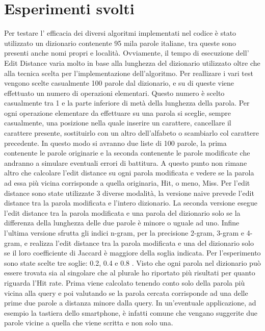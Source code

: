 \documentclass{article}
\begin{document}
\section{Esperimenti svolti}
Per testare l' efficacia dei diversi algoritmi implementati nel codice è stato utilizzato un dizionario contenente 95 mila parole italiane, tra queste sono presenti anche nomi propri e località. Ovviamente, il tempo di esecuzione dell' Edit Distance varia molto in base alla lunghezza del dizionario utilizzato oltre che alla tecnica scelta per l'implementazione dell'algoritmo. Per reallizare i vari test vengono scelte casualmente 100 parole dal dizionario, e su di queste viene effettuato un numero di operazioni elementari. Questo numero è scelto casualmente tra 1 e la parte inferiore di metà della lunghezza della parola. Per ogni operazione elementare da effettuare su una parola si sceglie, sempre casualmente, una posizione nella quale inserire un carattere, cancellare il carattere presente, sostituirlo con un altro dell'alfabeto o scambiarlo col carattere precedente. In questo modo  si avranno due liste di 100 parole, la prima contenente le parole originarie e la seconda contenente le parole modificate che andranno a simulare eventuali errori di battitura. A questo punto non rimane altro che calcolare l'edit distance su ogni parola modificata e vedere se la parola ad essa più vicina corrisponde a quella originaria, Hit, o meno, Miss.
Per l'edit distance sono state utilizzate 3 diverse modalità, la versione naive prevede l'edit distance tra la parola modificata e l'intero dizionario. La seconda versione esegue l'edit distance tra la parola modificata e una parola del dizionario solo se la differenza della lunghezza delle due parole è minore o uguale ad uno. Infine l'ultima versione sfrutta gli indici n-gram, per la precisione 2-gram, 3-gram e 4-gram, e realizza l'edit distance tra la parola modificata e una del dizionario solo se il loro coefficiente di Jaccard è maggiore della soglia indicata. Per l'esperimento sono state scelte tre soglie: 0.2, 0.4 e 0.8 .
 Visto che ogni parola nel dizionario può essere trovata sia al singolare che al plurale ho riportato più risultati per quanto riguarda l'Hit rate. Prima viene calcolato tenendo conto solo della parola più vicina alla query e poi valutando se la parola cercata corrisponde ad una delle prime due parole a distanza minore dalla query. In un'eventuale applicazione, ad esempio la tastiera dello smartphone, è infatti comune che vengano suggerite due parole vicine a quella che viene scritta e non solo una.
\end{document}

